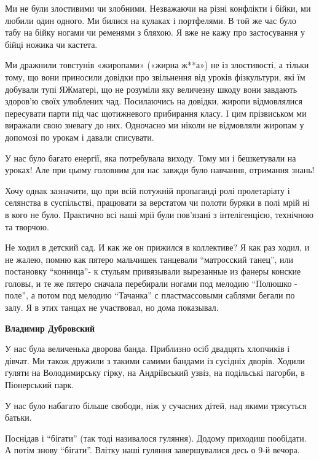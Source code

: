 \begin{itemize}
Ми не були злостивими чи злобними. Незважаючи на різні конфлікти і бійки, ми
любили один одного. Ми билися на кулаках і портфелями. В той же час було табу
на бійку ногами чи ременями з бляхою. Я вже не кажу про застосування у бійці
ножика чи кастета.

Ми дражнили товстунів «жиропами» («жирна ж**а») не із злостивості, а тільки
тому, що вони приносили довідки про звільнення від уроків фізкультури, які їм
добували тупі ЯЖматері, що не розуміли яку величезну шкоду вони завдають
здоров’ю своїх улюблених чад. Посилаючись на довідки, жиропи відмовлялися
пересувати парти під час щотижневого прибирання класу. І цим прізвиськом ми
виражали свою зневагу до них. Одночасно ми ніколи не відмовляли жиропам у
допомозі по урокам і давали списувати.

У нас було багато енергії, яка потребувала виходу. Тому ми і бешкетували на
уроках! Але при цьому головним для нас завжди було навчання, отримання знань!

Хочу однак зазначити, що при всій потужній пропаганді ролі пролетаріату і
селянства в суспільстві, працювати за верстатом чи полоти буряки в полі мрій ні
в кого не було. Практично всі наші мрії були пов’язані з інтелігенцією,
технічною та творчою.


Не ходил в детский сад. И как же он прижился в коллективе? Я как раз ходил, и
не жалею, помню как пятеро мальчишек танцевали \enquote{матросский танец}, или
постановку \enquote{конница}- к стульям привязывали вырезанные из фанеры конские
головы, и те же пятеро сначала перебирали ногами под мелодию \enquote{Полюшко - поле},
а потом под мелодию \enquote{Тачанка} с пластмассовыми саблями бегали по залу. Я в этих
танцах не участвовал, но дома показывал.

\begin{itemize} %
\textbf{Владимир Дубровский} 

У нас була величенька дворова банда. Приблизно осіб двадцять хлопчиків і
дівчат. Ми також дружили з такими самими бандами із сусідніх дворів. Ходили
гуляти на Володимирську гірку, на Андріївський узвіз, на подільські пагорби, в
Піонерський парк.

У нас було набагато більше свободи, ніж у сучасних дітей, над якими трясуться
батьки.

Поснідав і \enquote{бігати} (так тоді називалося гуляння). Додому приходиш
пообідати. А потім знову \enquote{бігати}. Влітку наші гуляння завершувалися
десь о 9-й вечора.


\end{itemize}
\end{itemize}
